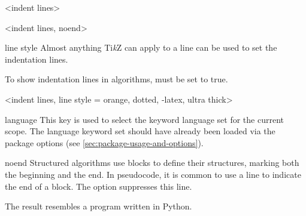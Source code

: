 \documentclass[a4paper, 11pt]{article}
\begin{document}
\begin{PDExample}
    \begin{algorithmic}
        <indent lines>
                \EndIf
            \EndFor
        \EndFor
    \end{algorithmic}

    \begin{algorithmic}
        <indent lines, noend>
                \EndIf
            \EndFor
        \EndFor
    \end{algorithmic}
\end{PDExample}

\begin{Optiondef}{line style}{}{}
    Almost anything Ti\emph{k}Z can apply to a line can be used to set the indentation lines.

    To show indentation lines in algorithms,  must be set to true.
\end{Optiondef}

\begin{PDExample}
    \begin{algorithmic}
        <indent lines, line style = {orange, dotted, -latex, ultra thick}>
                \EndIf
            \EndFor
        \EndFor
    \end{algorithmic}
\end{PDExample}


\begin{Optiondef}{language}{}{}
    This key is used to select the keyword language set for the current scope. The language keyword set should have already been loaded via the package options (see \cref{sec:package-usage-and-options}).
\end{Optiondef}

\begin{Optiondef}{noend}{}
    Structured algorithms use blocks to define their structures, marking both the beginning and the end. In pseudocode, it is common to use a line to indicate the end of a block. The  option suppresses this line.

    The result resembles a program written in Python.
\end{Optiondef}
\end{document}

